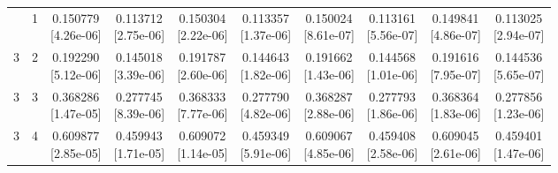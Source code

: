 \documentclass[12pt,letterpaper]{article}
\theoremstyle{plain}
\theoremstyle{definition}
\begin{document}
\begin{table}[p]
\begin{adjustbox}{max width=\linewidth}
\begin{tabular}{@{}rr*{8}{c}@{}}
\addlinespace[2pt]
3 & 1 & \shortstack{0.150779\\[-1pt]{\scriptsize[4.26e-06]}} & \shortstack{0.113712\\[-1pt]{\scriptsize[2.75e-06]}} & \shortstack{0.150304\\[-1pt]{\scriptsize[2.22e-06]}} & \shortstack{0.113357\\[-1pt]{\scriptsize[1.37e-06]}} & \shortstack{0.150024\\[-1pt]{\scriptsize[8.61e-07]}} & \shortstack{0.113161\\[-1pt]{\scriptsize[5.56e-07]}} & \shortstack{0.149841\\[-1pt]{\scriptsize[4.86e-07]}} & \shortstack{0.113025\\[-1pt]{\scriptsize[2.94e-07]}}\\
3 & 2 & \shortstack{0.192290\\[-1pt]{\scriptsize[5.12e-06]}} & \shortstack{0.145018\\[-1pt]{\scriptsize[3.39e-06]}} & \shortstack{0.191787\\[-1pt]{\scriptsize[2.60e-06]}} & \shortstack{0.144643\\[-1pt]{\scriptsize[1.82e-06]}} & \shortstack{0.191662\\[-1pt]{\scriptsize[1.43e-06]}} & \shortstack{0.144568\\[-1pt]{\scriptsize[1.01e-06]}} & \shortstack{0.191616\\[-1pt]{\scriptsize[7.95e-07]}} & \shortstack{0.144536\\[-1pt]{\scriptsize[5.65e-07]}}\\
3 & 3 & \shortstack{0.368286\\[-1pt]{\scriptsize[1.47e-05]}} & \shortstack{0.277745\\[-1pt]{\scriptsize[8.39e-06]}} & \shortstack{0.368333\\[-1pt]{\scriptsize[7.77e-06]}} & \shortstack{0.277790\\[-1pt]{\scriptsize[4.82e-06]}} & \shortstack{0.368287\\[-1pt]{\scriptsize[2.88e-06]}} & \shortstack{0.277793\\[-1pt]{\scriptsize[1.86e-06]}} & \shortstack{0.368364\\[-1pt]{\scriptsize[1.83e-06]}} & \shortstack{0.277856\\[-1pt]{\scriptsize[1.23e-06]}}\\
3 & 4 & \shortstack{0.609877\\[-1pt]{\scriptsize[2.85e-05]}} & \shortstack{0.459943\\[-1pt]{\scriptsize[1.71e-05]}} & \shortstack{0.609072\\[-1pt]{\scriptsize[1.14e-05]}} & \shortstack{0.459349\\[-1pt]{\scriptsize[5.91e-06]}} & \shortstack{0.609067\\[-1pt]{\scriptsize[4.85e-06]}} & \shortstack{0.459408\\[-1pt]{\scriptsize[2.58e-06]}} & \shortstack{0.609045\\[-1pt]{\scriptsize[2.61e-06]}} & \shortstack{0.459401\\[-1pt]{\scriptsize[1.47e-06]}}\\

\end{tabular}
\end{adjustbox}
\end{table}
\end{document}

